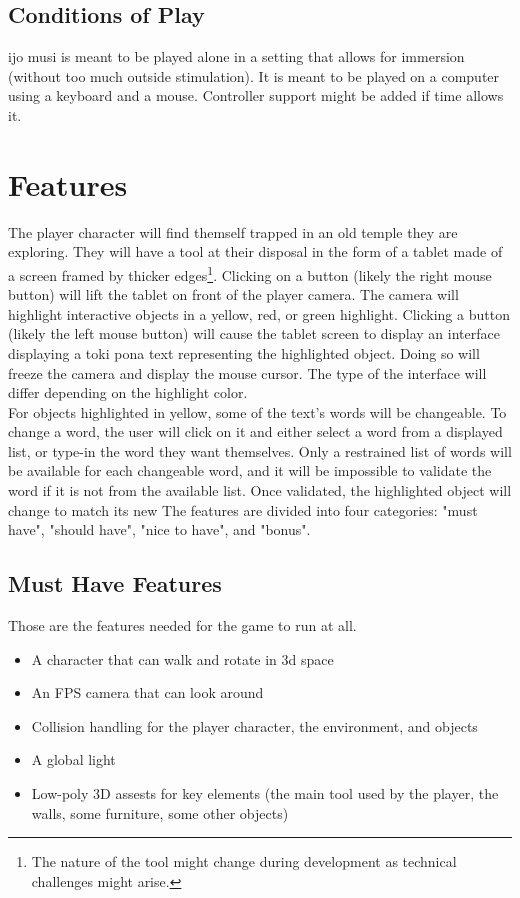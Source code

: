 \documentclass{scrartcl}
\begin{document}
		\subsection{Conditions of Play}
			ijo musi is meant to be played alone in a setting that allows for immersion (without too much outside stimulation). It is meant to be played on a computer using a keyboard and a mouse. Controller support might be added if time allows it.  
	\section{Features}
		The player character will find themself trapped in an old temple they are exploring. They will have a tool at their disposal in the form of a tablet made of a screen framed by thicker edges\footnote{The nature of the tool might change during development as technical challenges might arise.}. Clicking on a button (likely the right mouse button) will lift the tablet on front of the player camera. The camera will highlight interactive objects in a yellow, red, or green highlight. Clicking a button (likely the left mouse button) will cause the tablet screen to display an interface displaying a toki pona text representing the highlighted object. Doing so will freeze the camera and display the mouse cursor. The type of the interface will differ depending on the highlight color.\\
		For objects highlighted in yellow, some of the text's words will be changeable. To change a word, the user will click on it and either select a word from a displayed list, or type-in the word they want themselves. Only a restrained list of words will be available for each changeable word, and it will be impossible to validate the word if it is not from the available list. Once validated, the highlighted object will change to match its new 
		The features are divided into four categories: "must have", "should have", "nice to have", and "bonus".
		\subsection{Must Have Features}
			Those are the features needed for the game to run at all.
			\begin{itemize}
				\item A character that can walk and rotate in 3d space
				\item An FPS camera that can look around
				\item Collision handling for the player character, the environment, and objects
				\item A global light
				\item Low-poly 3D assests for key elements (the main tool used by the player, the walls, some furniture, some other objects)
				
			\end{itemize}
\end{document}
